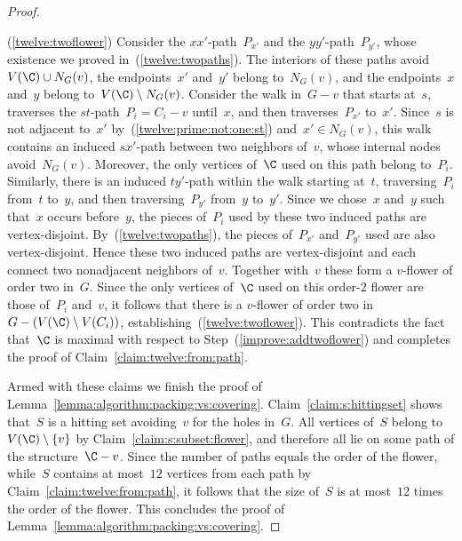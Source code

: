 \begin{proof}
\begin{claimproof}
(\ref{twelve:twoflower}) Consider the $xx'$-path~$P_{x'}$ and the $yy'$-path~$P_{y'}$, whose existence we proved in~(\ref{twelve:twopaths}). The interiors of these paths avoid~$V(\C) \cup N_G(v)$, the endpoints~$x'$ and~$y'$ belong to~$N_G(v)$, and the endpoints~$x$ and~$y$ belong to~$V(\C) \setminus N_G(v)$. Consider the walk in~$G-v$ that starts at~$s$, traverses the $st$-path~$P_i = C_i - v$ until~$x$, and then traverses~$P_{x'}$ to~$x'$. Since~$s$ is not adjacent to~$x'$ by~(\ref{twelve:prime:not:one:st}) and~$x' \in N_G(v)$, this walk contains an induced $sx'$-path between two neighbors of~$v$, whose internal nodes avoid~$N_G(v)$. Moreover, the only vertices of~$\C$ used on this path belong to~$P_i$. Similarly, there is an induced $ty'$-path within the walk starting at~$t$, traversing~$P_i$ from~$t$ to~$y$, and then traversing~$P_{y'}$ from~$y$ to~$y'$. Since we chose~$x$ and~$y$ such that~$x$ occurs before~$y$, the pieces of~$P_i$ used by these two induced paths are vertex-disjoint. By~(\ref{twelve:twopaths}), the pieces of~$P_{x'}$ and~$P_{y'}$ used are also vertex-disjoint. Hence these two induced paths are vertex-disjoint and each connect two nonadjacent neighbors of~$v$. Together with~$v$ these form a $v$-flower of order two in~$G$. Since the only vertices of~$\C$ used on this order-$2$ flower are those of~$P_i$ and~$v$, it follows that there is a $v$-flower of order two in~$G - (V(\C) \setminus V(C_i))$, establishing~(\ref{twelve:twoflower}). This contradicts the fact that~$\C$ is maximal with respect to Step~(\ref{improve:addtwoflower}) and completes the proof of Claim~\ref{claim:twelve:from:path}.
\end{claimproof}

Armed with these claims we finish the proof of Lemma~\ref{lemma:algorithm:packing:vs:covering}. Claim~\ref{claim:s:hittingset} shows that~$S$ is a hitting set avoiding~$v$ for the holes in~$G$. All vertices of~$S$ belong to~$V(\C) \setminus \{v\}$ by Claim~\ref{claim:s:subset:flower}, and therefore all lie on some path of the structure~$\C - v$. Since the number of paths equals the order of the flower, while~$S$ contains at most~$12$ vertices from each path by Claim~\ref{claim:twelve:from:path}, it follows that the size of~$S$ is at most~$12$ times the order of the flower. This concludes the proof of Lemma~\ref{lemma:algorithm:packing:vs:covering}.
\end{proof}


